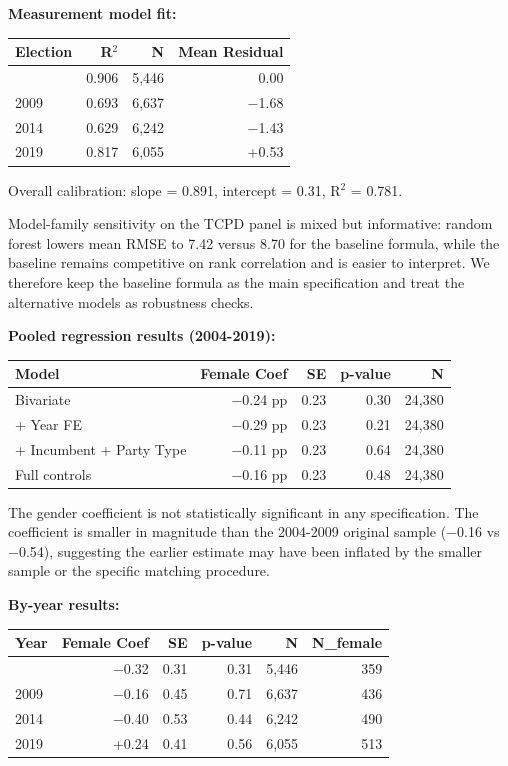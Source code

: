 \documentclass[
]{article}
\newcounter{none} %
\begin{document}
\textbf{Measurement model fit:}

{\def\LTcaptype{none} %
\begin{longtable}[]{@{}lrrr@{}}
\toprule\noalign{}
Election & R$^2$ & N & Mean Residual \\
\midrule\noalign{}
\endhead
\bottomrule\noalign{}
\endlastfoot
2004 & 0.906 & 5,446 & 0.00 \\
2009 & 0.693 & 6,637 & $-$1.68 \\
2014 & 0.629 & 6,242 & $-$1.43 \\
2019 & 0.817 & 6,055 & +0.53 \\
\end{longtable}
}

Overall calibration: slope = 0.891, intercept = 0.31, R$^2$ = 0.781.

Model-family sensitivity on the TCPD panel is mixed but informative: random forest lowers mean RMSE to 7.42 versus 8.70 for the baseline formula, while the baseline remains competitive on rank correlation and is easier to interpret. We therefore keep the baseline formula as the main specification and treat the alternative models as robustness checks.

\textbf{Pooled regression results (2004-2019):}

{\def\LTcaptype{none} %
\begin{longtable}[]{@{}lrrrr@{}}
\toprule\noalign{}
Model & Female Coef & SE & p-value & N \\
\midrule\noalign{}
\endhead
\bottomrule\noalign{}
\endlastfoot
Bivariate & $-$0.24 pp & 0.23 & 0.30 & 24,380 \\
+ Year FE & $-$0.29 pp & 0.23 & 0.21 & 24,380 \\
+ Incumbent + Party Type & $-$0.11 pp & 0.23 & 0.64 & 24,380 \\
Full controls & $-$0.16 pp & 0.23 & 0.48 & 24,380 \\
\end{longtable}
}

The gender coefficient is not statistically significant in any specification. The coefficient is smaller in magnitude than the 2004-2009 original sample ($-$0.16 vs $-$0.54), suggesting the earlier estimate may have been inflated by the smaller sample or the specific matching procedure.

\textbf{By-year results:}

{\def\LTcaptype{none} %
\begin{longtable}[]{@{}lrrrrr@{}}
\toprule\noalign{}
Year & Female Coef & SE & p-value & N & N\_female \\
\midrule\noalign{}
\endhead
\bottomrule\noalign{}
\endlastfoot
2004 & $-$0.32 & 0.31 & 0.31 & 5,446 & 359 \\
2009 & $-$0.16 & 0.45 & 0.71 & 6,637 & 436 \\
2014 & $-$0.40 & 0.53 & 0.44 & 6,242 & 490 \\
2019 & +0.24 & 0.41 & 0.56 & 6,055 & 513 \\
\end{longtable}
}
\end{document}
